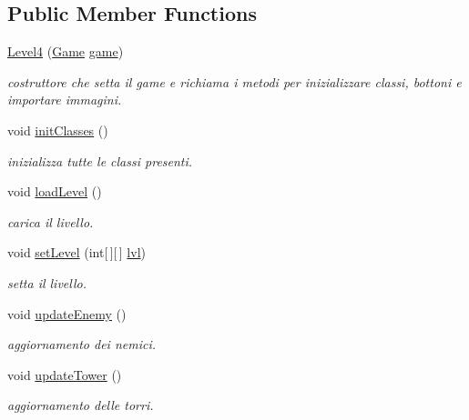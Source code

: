 \subsection*{Public Member Functions}
\begin{DoxyCompactItemize}
\item 
\hyperlink{classscenes_1_1_level4_ace3453f4ef6ea220bef6de5f957e89d5}{Level4} (\hyperlink{classprogetto_1_1_game}{Game} \hyperlink{classscenes_1_1_game_scene_ac6a5ed6191fcf3a5bf0445921feb4f48}{game})
\begin{DoxyCompactList}\small\item\em costruttore che setta il game e richiama i metodi per inizializzare classi, bottoni e importare immagini. \end{DoxyCompactList}\item 
void \hyperlink{classscenes_1_1_level4_afe125d345675ffefe8da7e96d39773f3}{init\+Classes} ()
\begin{DoxyCompactList}\small\item\em inizializza tutte le classi presenti. \end{DoxyCompactList}\item 
void \hyperlink{classscenes_1_1_level4_a286931cc46e197f4a85af7229fdc29a4}{load\+Level} ()
\begin{DoxyCompactList}\small\item\em carica il livello. \end{DoxyCompactList}\item 
void \hyperlink{classscenes_1_1_level4_afdd7363804bf6696ce4a46d6448844ed}{set\+Level} (int\mbox{[}$\,$\mbox{]}\mbox{[}$\,$\mbox{]} \hyperlink{classscenes_1_1_level4_a4b06a2210cf5b93dda77f2a9a061d538}{lvl})
\begin{DoxyCompactList}\small\item\em setta il livello. \end{DoxyCompactList}\item 
void \hyperlink{classscenes_1_1_level4_af005ec68c869a6acd5e833cba9330a50}{update\+Enemy} ()
\begin{DoxyCompactList}\small\item\em aggiornamento dei nemici. \end{DoxyCompactList}\item 
void \hyperlink{classscenes_1_1_level4_ae4fd4a959e4d782a5e7ac0eff77ba27f}{update\+Tower} ()
\begin{DoxyCompactList}\small\item\em aggiornamento delle torri. \end{DoxyCompactList}\item 

\end{DoxyCompactItemize}

